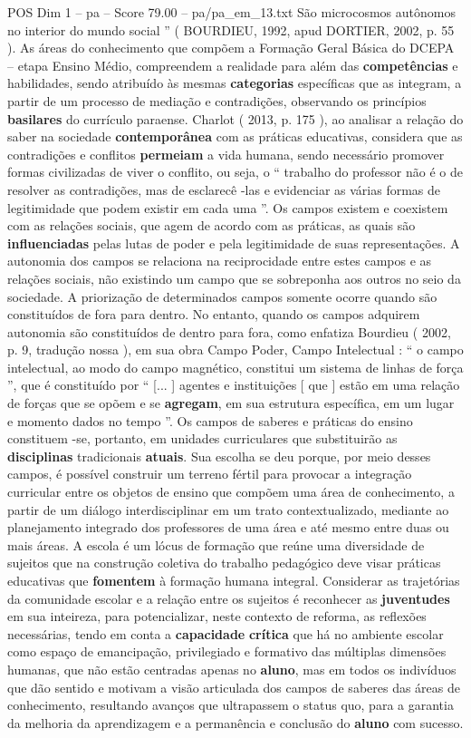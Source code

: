 \begin{textsample}{POS Dim 1 – pa – Score 79.00 – pa/pa\_em\_13.txt}
São microcosmos autônomos no interior do mundo social ” ( BOURDIEU, 1992, apud DORTIER, 2002, p. 55 ).
As áreas do conhecimento que compõem a Formação Geral Básica do DCEPA – etapa Ensino Médio, compreendem a realidade para além das \textbf{competências} e habilidades, sendo atribuído às mesmas \textbf{categorias} específicas que as integram, a partir de um processo de mediação e contradições, observando os princípios \textbf{basilares} do currículo paraense.
Charlot ( 2013, p. 175 ), ao analisar a relação do saber na sociedade \textbf{contemporânea} com as práticas educativas, considera que as contradições e conflitos \textbf{permeiam} a vida humana, sendo necessário promover formas civilizadas de viver o conflito, ou seja, o “ trabalho do professor não é o de resolver as contradições, mas de esclarecê -las e evidenciar as várias formas de legitimidade que podem existir em cada uma ”.
Os campos existem e coexistem com as relações sociais, que agem de acordo com as práticas, as quais são \textbf{influenciadas} pelas lutas de poder e pela legitimidade de suas representações.
A autonomia dos campos se relaciona na reciprocidade entre estes campos e as relações sociais, não existindo um campo que se sobreponha aos outros no seio da sociedade.
A priorização de determinados campos somente ocorre quando são constituídos de fora para dentro.
No entanto, quando os campos adquirem autonomia são constituídos de dentro para fora, como enfatiza Bourdieu ( 2002, p. 9, tradução nossa ), em sua obra Campo Poder, Campo Intelectual : “ o campo intelectual, ao modo do campo magnético, constitui um sistema de linhas de força ”, que é constituído por “ [... ] agentes e instituições [ que ] estão em uma relação de forças que se opõem e se \textbf{agregam}, em sua estrutura específica, em um lugar e momento dados no tempo ”.
Os campos de saberes e práticas do ensino constituem -se, portanto, em unidades curriculares que substituirão as \textbf{disciplinas} tradicionais \textbf{atuais}.
Sua escolha se deu porque, por meio desses campos, é possível construir um terreno fértil para provocar a integração curricular entre os objetos de ensino que compõem uma área de conhecimento, a partir de um diálogo interdisciplinar em um trato contextualizado, mediante ao planejamento integrado dos professores de uma área e até mesmo entre duas ou mais áreas.
A escola é um lócus de formação que reúne uma diversidade de sujeitos que na construção coletiva do trabalho pedagógico deve visar práticas educativas que \textbf{fomentem} à formação humana integral.
Considerar as trajetórias da comunidade escolar e a relação entre os sujeitos é reconhecer as \textbf{juventudes} em sua inteireza, para potencializar, neste contexto de reforma, as reflexões necessárias, tendo em conta a \textbf{capacidade} \textbf{crítica} que há no ambiente escolar como espaço de emancipação, privilegiado e formativo das múltiplas dimensões humanas, que não estão centradas apenas no \textbf{aluno}, mas em todos os indivíduos que dão sentido e motivam a visão articulada dos campos de saberes das áreas de conhecimento, resultando avanços que ultrapassem o status quo, para a garantia da melhoria da aprendizagem e a permanência e conclusão do \textbf{aluno} com sucesso.

\end{textsample}

